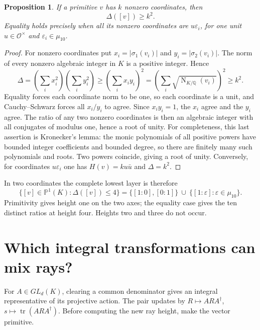 \documentclass[11pt,a4paper]{article}
\newtheorem{proposition}{Proposition}
\newcommand{\Q}{\mathbb Q}
\newcommand{\PP}{\mathbb P}
\newcommand{\OO}{\mathcal O}
\newcommand{\Nm}{\operatorname{N}}
\newcommand{\tr}{\operatorname{tr}}
\begin{document}
\begin{proposition}\label{prop:height}
If a primitive $v$ has $k$ nonzero coordinates, then
\begin{equation}\label{eq:bound}
 \Delta([v])\geq k^2.
\end{equation}
Equality holds precisely when all its nonzero coordinates are
$u\varepsilon_i$, for one unit $u\in\OO^\times$ and
$\varepsilon_i\in\mu_{10}$.
\end{proposition}
\begin{proof}
For nonzero coordinates put $x_i=|\sigma_1(v_i)|$ and
$y_i=|\sigma_2(v_i)|$. The norm of every nonzero algebraic integer
in $K$ is a positive integer. Hence
\begin{equation}\label{eq:bound-proof}
 \Delta=(\sum_i x_i^2)(\sum_i y_i^2)
 \geq(\sum_i x_i y_i)^2
 =\left(\sum_i\sqrt{\Nm_{K/\Q}(v_i)}\right)^2\geq k^2.
\end{equation}
Equality forces each coordinate norm to be one, so each coordinate
is a unit, and Cauchy--Schwarz forces all $x_i/y_i$ to agree.
Since $x_i y_i=1$, the $x_i$ agree and the $y_i$ agree.
The ratio of any two nonzero coordinates is then an algebraic
integer with all conjugates of modulus one, hence a root of unity.
For completeness, this last assertion is Kronecker's lemma: the
monic polynomials of all positive powers have bounded integer
coefficients and bounded degree, so there are finitely many such
polynomials and roots. Two powers coincide, giving a root of unity.
Conversely, for coordinates $u\varepsilon_i$ one has
$H(v)=k u\bar u$ and $\Delta=k^2$.
\end{proof}

In two coordinates the complete lowest layer is therefore
\begin{equation}\label{eq:twelve}
 \{[v]\in\PP^1(K):\Delta([v])\leq4\}
 =\{[1:0],[0:1]\}\ \cup\ \{[1:\varepsilon]:\varepsilon\in\mu_{10}\}.
\end{equation}
Primitivity gives height one on the two axes; the equality case
gives the ten distinct ratios at height four. Heights two and three
do not occur.

\section{Which integral transformations can mix rays?}\label{sec:transformations}
For $A\in GL_d(K)$, clearing a common denominator gives an integral
representative of its projective action. The pair updates by
$R\mapsto ARA^\dagger$, $s\mapsto\tr(ARA^\dagger)$.
Before computing the new ray height, make the vector primitive.
\end{document}

